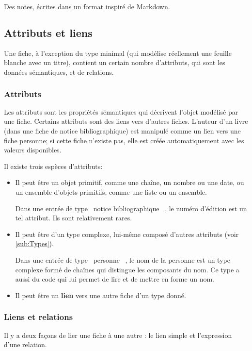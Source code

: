 \documentclass[11pt,french]{article}
\makeatletter
\providecommand{\og}{\leavevmode\flqq~}%
\providecommand{\fg}{\ifdim\lastskip>\z@\unskip\fi~\frqq}%
\makeatother
\begin{document}
Des notes, écrites dans un format inspiré de Markdown.


\subsection{Attributs et liens}

Une fiche, à l'exception du type minimal (qui modélise réellement
une feuille blanche avec un titre), contient un certain nombre d'attributs,
qui sont les données sémantiques, et de relations.


\subsubsection{Attributs \label{par:attributs}}

Les attributs sont les propriétés sémantiques qui décrivent l'objet
modélisé par une fiche. Certains attributs sont des liens vers d'autres
fiches. L'auteur d'un livre (dans une fiche de notice bibliographique)
est manipulé comme un lien vers une fiche personne; si cette fiche
n'existe pas, elle est créée automatiquement avec les valeurs disponibles.

Il existe trois espèces d'attributs:
\begin{itemize}
\item Il peut être un objet primitif, comme une chaîne, un nombre ou une
date, ou un ensemble d'objets primitifs, comme une liste ou un ensemble.


Dans une entrée de type \og notice bibliographique \fg{}, le numéro
d'édition est un tel attribut. Ils sont relativement rares.

\item Il peut être d'un type complexe, lui-même composé d'autres attributs
(voir \vref{sub:Types}).


Dans une entrée de type \og personne \fg{}, le nom de la personne
est un type complexe formé de chaînes qui distingue les composants
du nom. Ce type a aussi du code qui lui permet de lire et de mettre
en forme un nom.

\item Il peut être un \textbf{lien} vers une autre fiche d'un type donné. 
\end{itemize}

\subsubsection{Liens et relations}

Il y a deux façons de lier une fiche à une autre : le lien simple
et l'expression d'une relation.
\end{document}
